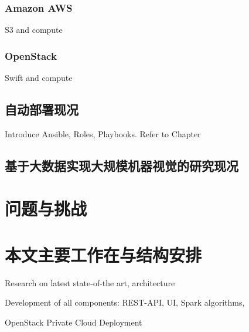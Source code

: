 \subsubsection{Amazon AWS}
S3 and compute

\subsubsection{OpenStack}
\label{subsubsec:openstack}
Swift and compute

\subsection{自动部署现况}
\label{subsec:automated_deployment}

Introduce Ansible, Roles, Playbooks. Refer to Chapter

\subsection{基于大数据实现大规模机器视觉的研究现况}
\label{subsec:bigdata_cv_background}

\section{问题与挑战}
\label{sec:challenges}

\section{本文主要工作在与结构安排}
\label{sec:main_work}

Research on latest state-of-the art, architecture

Development of all components: REST-API, UI, Spark algorithms,

OpenStack Private Cloud Deployment

